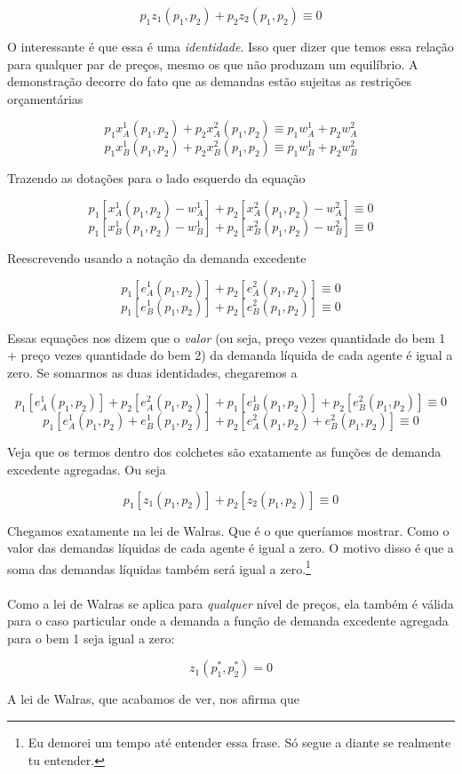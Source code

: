 \documentclass[a4paper,11pt,oneside]{book}
\theoremstyle{definition}
\theoremstyle{break}
\begin{document}
$$p_1 z_1(p_1,p_2) + p_2 z_2(p_1,p_2) \equiv 0$$

O interessante é que essa é uma \textit{identidade}. Isso quer dizer que temos essa relação para qualquer par de preços, mesmo os que não produzam um equilíbrio. A demonstração decorre do fato que as demandas estão sujeitas as restrições orçamentárias

$$p_1x_A^1(p_1,p_2) + p_2x_A^2(p_1,p_2) \equiv p_1w_A^1 + p_2w_A^2$$
$$p_1x_B^1(p_1,p_2) + p_2x_B^2(p_1,p_2) \equiv p_1w_B^1 + p_2w_B^2$$

Trazendo as dotações para o lado esquerdo da equação

$$p_1[x_A^1(p_1,p_2) - w_A^1] + p_2[x_A^2(p_1,p_2) - w_A^2] \equiv 0$$
$$p_1[x_B^1(p_1,p_2) - w_B^1] + p_2[x_B^2(p_1,p_2) - w_B^2] \equiv 0$$

Reescrevendo usando a notação da demanda excedente

$$p_1[e_A^1(p_1,p_2)] + p_2[e_A^2(p_1,p_2)] \equiv 0$$
$$p_1[e_B^1(p_1,p_2)] + p_2[e_B^2(p_1,p_2)] \equiv 0$$

Essas equações nos dizem que o \textit{valor} (ou seja, preço vezes quantidade do bem 1 + preço vezes quantidade do bem 2) da demanda líquida de cada agente é igual a zero. Se somarmos as duas identidades, chegaremos a

$$p_1[e_A^1(p_1,p_2)] + p_2[e_A^2(p_1,p_2)] + 
p_1[e_B^1(p_1,p_2)] + p_2[e_B^2(p_1,p_2)] \equiv 0$$
$$p_1[e_A^1(p_1,p_2) + e_B^1(p_1,p_2)] + p_2[e_A^2(p_1,p_2) + e_B^2(p_1,p_2)] \equiv 0$$

Veja que os termos dentro dos colchetes são exatamente as funções de demanda excedente agregadas. Ou seja

$$p_1[z_1(p_1,p_2)] + p_2[z_2(p_1,p_2) ] \equiv 0$$

Chegamos exatamente na lei de Walras. Que é o que queríamos mostrar. Como o valor das demandas líquidas de cada agente é igual a zero. O motivo disso é que a soma das demandas líquidas também será igual a zero.\footnote{Eu demorei um tempo até entender essa frase. Só segue a diante se realmente tu entender.}
\\~\\
Como a lei de Walras se aplica para \textit{qualquer} nível de preços, ela também é válida para o caso particular onde a demanda a função de demanda excedente agregada para o bem 1 seja igual a zero:

$$z_1(p_1^*,p_2^*) = 0$$

A lei de Walras, que acabamos de ver, nos afirma que
\end{document}

